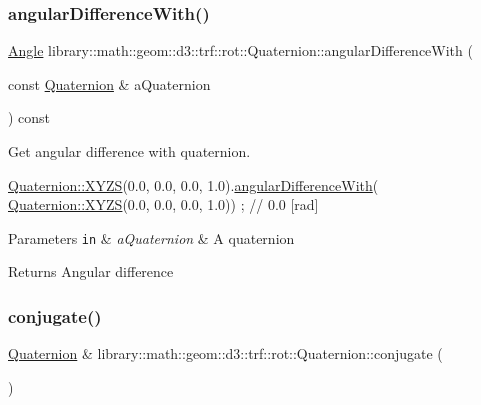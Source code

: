 \subsubsection{\texorpdfstring{angular\+Difference\+With()}{angularDifferenceWith()}}
{\footnotesize\ttfamily \hyperlink{classlibrary_1_1math_1_1geom_1_1_angle}{Angle} library\+::math\+::geom\+::d3\+::trf\+::rot\+::\+Quaternion\+::angular\+Difference\+With (\begin{DoxyParamCaption}\item[{const \hyperlink{classlibrary_1_1math_1_1geom_1_1d3_1_1trf_1_1rot_1_1_quaternion}{Quaternion} \&}]{a\+Quaternion }\end{DoxyParamCaption}) const}



Get angular difference with quaternion. 


\begin{DoxyCode}
\hyperlink{classlibrary_1_1math_1_1geom_1_1d3_1_1trf_1_1rot_1_1_quaternion_a006294eb483bcfc352c2dc36cf19ceec}{Quaternion::XYZS}(0.0, 0.0, 0.0, 1.0).\hyperlink{classlibrary_1_1math_1_1geom_1_1d3_1_1trf_1_1rot_1_1_quaternion_a6b75e097378cd268927a0488cf9caf30}{angularDifferenceWith}(
      \hyperlink{classlibrary_1_1math_1_1geom_1_1d3_1_1trf_1_1rot_1_1_quaternion_a006294eb483bcfc352c2dc36cf19ceec}{Quaternion::XYZS}(0.0, 0.0, 0.0, 1.0)) ; \textcolor{comment}{// 0.0 [rad]}
\end{DoxyCode}



\begin{DoxyParams}[1]{Parameters}
\mbox{\tt in}  & {\em a\+Quaternion} & A quaternion \\
\hline
\end{DoxyParams}
\begin{DoxyReturn}{Returns}
Angular difference 
\end{DoxyReturn}
\mbox{\label{classlibrary_1_1math_1_1geom_1_1d3_1_1trf_1_1rot_1_1_quaternion_a2c27f0a46d1f156b8d05e0e9746b33f9}} 
\subsubsection{\texorpdfstring{conjugate()}{conjugate()}}
{\footnotesize\ttfamily \hyperlink{classlibrary_1_1math_1_1geom_1_1d3_1_1trf_1_1rot_1_1_quaternion}{Quaternion} \& library\+::math\+::geom\+::d3\+::trf\+::rot\+::\+Quaternion\+::conjugate (\begin{DoxyParamCaption}{ }\end{DoxyParamCaption})}



